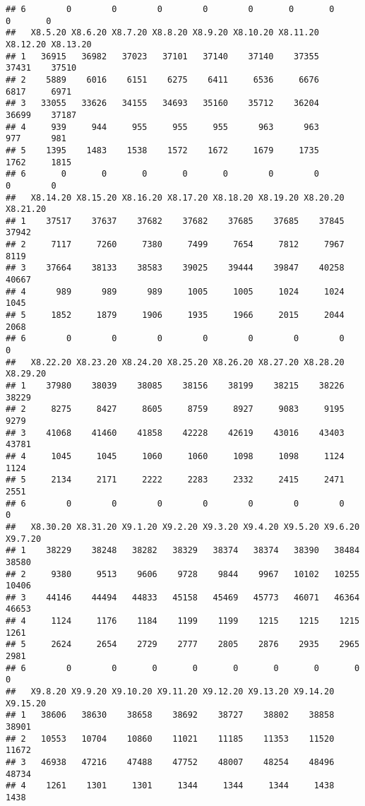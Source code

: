 \documentclass[
]{article}
\begin{document}
\begin{verbatim}
## 6        0        0        0        0        0       0       0       0       0
##   X8.5.20 X8.6.20 X8.7.20 X8.8.20 X8.9.20 X8.10.20 X8.11.20 X8.12.20 X8.13.20
## 1   36915   36982   37023   37101   37140    37140    37355    37431    37510
## 2    5889    6016    6151    6275    6411     6536     6676     6817     6971
## 3   33055   33626   34155   34693   35160    35712    36204    36699    37187
## 4     939     944     955     955     955      963      963      977      981
## 5    1395    1483    1538    1572    1672     1679     1735     1762     1815
## 6       0       0       0       0       0        0        0        0        0
##   X8.14.20 X8.15.20 X8.16.20 X8.17.20 X8.18.20 X8.19.20 X8.20.20 X8.21.20
## 1    37517    37637    37682    37682    37685    37685    37845    37942
## 2     7117     7260     7380     7499     7654     7812     7967     8119
## 3    37664    38133    38583    39025    39444    39847    40258    40667
## 4      989      989      989     1005     1005     1024     1024     1045
## 5     1852     1879     1906     1935     1966     2015     2044     2068
## 6        0        0        0        0        0        0        0        0
##   X8.22.20 X8.23.20 X8.24.20 X8.25.20 X8.26.20 X8.27.20 X8.28.20 X8.29.20
## 1    37980    38039    38085    38156    38199    38215    38226    38229
## 2     8275     8427     8605     8759     8927     9083     9195     9279
## 3    41068    41460    41858    42228    42619    43016    43403    43781
## 4     1045     1045     1060     1060     1098     1098     1124     1124
## 5     2134     2171     2222     2283     2332     2415     2471     2551
## 6        0        0        0        0        0        0        0        0
##   X8.30.20 X8.31.20 X9.1.20 X9.2.20 X9.3.20 X9.4.20 X9.5.20 X9.6.20 X9.7.20
## 1    38229    38248   38282   38329   38374   38374   38390   38484   38580
## 2     9380     9513    9606    9728    9844    9967   10102   10255   10406
## 3    44146    44494   44833   45158   45469   45773   46071   46364   46653
## 4     1124     1176    1184    1199    1199    1215    1215    1215    1261
## 5     2624     2654    2729    2777    2805    2876    2935    2965    2981
## 6        0        0       0       0       0       0       0       0       0
##   X9.8.20 X9.9.20 X9.10.20 X9.11.20 X9.12.20 X9.13.20 X9.14.20 X9.15.20
## 1   38606   38630    38658    38692    38727    38802    38858    38901
## 2   10553   10704    10860    11021    11185    11353    11520    11672
## 3   46938   47216    47488    47752    48007    48254    48496    48734
## 4    1261    1301     1301     1344     1344     1344     1438     1438

\end{verbatim}
\end{document}
